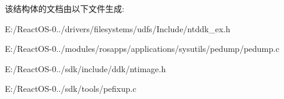 该结构体的文档由以下文件生成\+:\begin{DoxyCompactItemize}
\item 
E\+:/\+React\+O\+S-\/0../drivers/filesystems/udfs/\+Include/ntddk\+\_\+ex.\+h\item 
E\+:/\+React\+O\+S-\/0../modules/rosapps/applications/sysutils/pedump/pedump.\+c\item 
E\+:/\+React\+O\+S-\/0../sdk/include/ddk/ntimage.\+h\item 
E\+:/\+React\+O\+S-\/0../sdk/tools/pefixup.\+c\end{DoxyCompactItemize}
